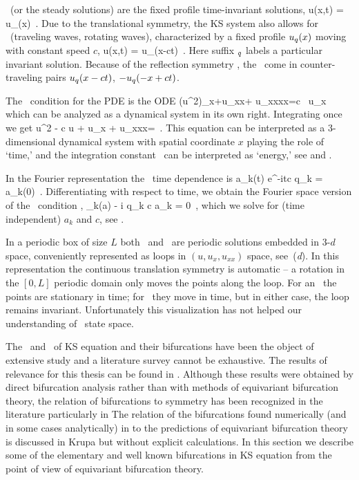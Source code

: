 \Eqva\  (or the steady solutions)
are the fixed profile time-invariant solutions,
\beq
 u(x,t) = u_\stagn(x)
\,.
Due to the translational symmetry,
the KS system also allows for
\reqva\ (traveling waves, rotating waves),
characterized by a fixed profile $u_\stagn(x)$
moving with constant speed $c$, {\ie}
\beq
 u(x,t) =  u_\stagn(x-ct)
\,.
Here suffix ${}_\stagn$ labels a particular invariant solution.
Because of the reflection symmetry ,
the \reqva\ come in counter-traveling pairs
$u_\stagn(x-ct)$, $-u_\stagn(-x+ct)$.

The \reqv\ condition for the {\KS} PDE 
is the ODE
\beq
{\textstyle{}}(u^2)_x+u_{xx}+ u_{xxxx}=c \, u_x
which can be analyzed as a dynamical system in its own right.
Integrating once we get
\beq
{\textstyle{}}u^2 - c u + u_x + u_{xxx}=\expctE
\,.
\label{eq:stdks}
\eeq
This equation can be interpreted as a 3-dimen\-si\-on\-al dynamical system
with spatial coordinate $x$ playing the role of `time,'
and the integration constant \expctE\ can be interpreted as `energy,'
see  and .

In the Fourier representation the \reqva\ time dependence is
\beq
 a_k(t) e^{-itc q_k} = a_k(0)
\,.
Differentiating with respect to time, we obtain
the Fourier space version of the \reqv\ condition
,
\beq
 \pVeloc_k(a) - i q_k c a_k = 0
\,,
which we solve for (time independent) $a_k$ and $c$, see .

In a periodic box of size $L$
both \eqva\ and \reqva\ are  periodic solutions
embedded in 3-$d$ space, conveniently represented as loops in
$(u,u_x,u_{xx})$ space, see \,(\textit{d}).
In this representation the continuous translation symmetry
is automatic -- a rotation in the $[0,L]$ periodic domain only
moves the points along the loop. For an \eqv\ the points
are stationary in time; for \reqv\ they move in time, but in
either case, the loop remains invariant.
Unfortunately this visualization has not helped
our understanding of \KSe\ state space.

The  \eqva\ and \reqva\ of KS equation and their bifurcations have been
the object of extensive study and a literature survey
cannot be exhaustive. The results of relevance for this thesis can be
found in .
Although these results were obtained by direct bifurcation
analysis rather than with methods of equivariant
bifurcation theory, the relation of bifurcations to 
symmetry has been recognized in the literature particularly in
 The relation of the bifurcations
found numerically (and in some cases analytically) in
 to the predictions of equivariant bifurcation
theory is discussed in Krupa but
without explicit calculations. In this section we describe some
of the elementary and well known bifurcations in KS equation
from the point of view of equivariant bifurcation theory.

